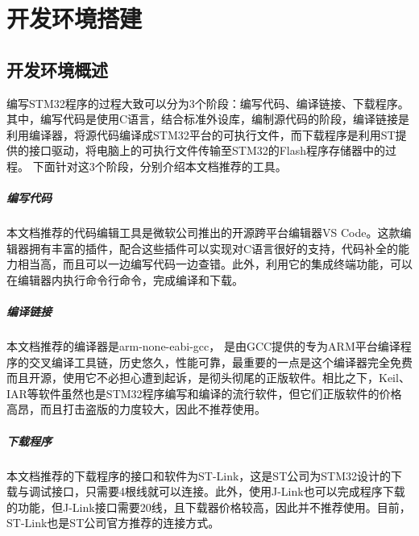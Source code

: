 \renewenvironment{longtable}{\rowcolors{2}{LightGray}{white}\oldlongtable} {\endoldlongtable}
\chapter{开发环境搭建}
\section{开发环境概述}
编写STM32程序的过程大致可以分为3个阶段：编写代码、编译链接、下载程序。其中，编写代码是使用C语言，结合标准外设库，编制源代码的阶段，编译链接是利用编译器，将源代码编译成STM32平台的可执行文件，而下载程序是利用ST提供的接口驱动，将电脑上的可执行文件传输至STM32的Flash程序存储器中的过程。
下面针对这3个阶段，分别介绍本文档推荐的工具。
\paragraph{编写代码} 
本文档推荐的代码编辑工具是微软公司推出的开源跨平台编辑器VS Code。这款编辑器拥有丰富的插件，配合这些插件可以实现对C语言很好的支持，代码补全的能力相当高，而且可以一边编写代码一边查错。此外，利用它的集成终端功能，可以在编辑器内执行命令行命令，完成编译和下载。
\paragraph{编译链接}
本文档推荐的编译器是arm-none-eabi-gcc， 是由GCC提供的专为ARM平台编译程序的交叉编译工具链，历史悠久，性能可靠，最重要的一点是这个编译器完全免费而且开源，使用它不必担心遭到起诉，是彻头彻尾的正版软件。相比之下，Keil、IAR等软件虽然也是STM32程序编写和编译的流行软件，但它们正版软件的价格高昂，而且打击盗版的力度较大，因此不推荐使用。
\paragraph{下载程序}
本文档推荐的下载程序的接口和软件为ST-Link，这是ST公司为STM32设计的下载与调试接口，只需要4根线就可以连接。此外，使用J-Link也可以完成程序下载的功能，但J-Link接口需要20线，且下载器价格较高，因此并不推荐使用。目前，ST-Link也是ST公司官方推荐的连接方式。

